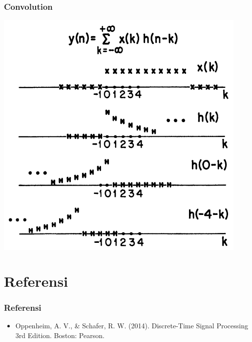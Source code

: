 \documentclass[pdflatex,compress]{beamer}
\begin{document}
\begin{frame}
	\frametitle{Convolution}
	\begin{center}
		\includegraphics[height=0.8\textheight]{img/img016}
	\end{center}
\end{frame}

\section{Referensi}

\begin{frame}
	\frametitle{Referensi}
	\begin{itemize}
		\item Oppenheim, A. V., \& Schafer, R. W. (2014). Discrete-Time Signal Processing 3rd Edition. Boston: Pearson.
	\end{itemize}
\end{frame}
\end{document}
